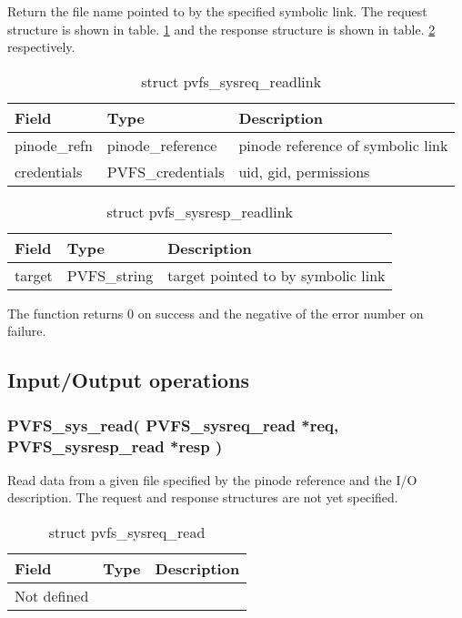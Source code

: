 \documentclass[11pt, letterpaper]{article}
\begin{document}
Return the file name pointed to by the specified symbolic link. The request
structure is shown in table. \ref{tab:reqreadlk} and the response structure
is shown in table. \ref{tab:respreadlk} respectively. 

\begin{table}[H]
\begin{tabular}{|l|l|l|}
\hline
Field & Type & Description \\
\hline
\hline
pinode\_refn & pinode\_reference & pinode reference of symbolic link \\
\hline
credentials & PVFS\_credentials & uid, gid, permissions \\
\hline
\end{tabular}
\caption{struct pvfs\_sysreq\_readlink}\label{tab:reqreadlk}
\end{table}

\begin{table}[H]
\begin{tabular}{|l|l|l|}
\hline
Field & Type & Description \\
\hline
\hline
target & PVFS\_string & target pointed to by symbolic link \\
\hline
\end{tabular}
\caption{struct pvfs\_sysresp\_readlink}\label{tab:respreadlk}
\end{table}

The function returns 0 on success and the negative of the error
number on failure.

\subsection{Input/Output operations}

\subsubsection{PVFS\_sys\_read(
PVFS\_sysreq\_read *req,
PVFS\_sysresp\_read *resp
)}

Read data from a given file specified by the pinode reference
and the I/O description. The request and response structures
are not yet specified.

\begin{table}[H]
\begin{tabular}{|l|l|l|}
\hline
Field & Type & Description \\
\hline
\hline
Not defined & & \\
\hline
\end{tabular}
\caption{struct pvfs\_sysreq\_read}\label{tab:reqread}
\end{table}
\end{document}
